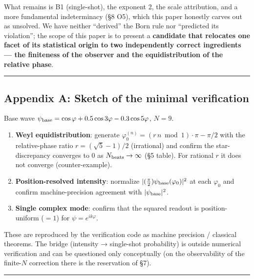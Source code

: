 \documentclass[
]{ltjsarticle}
\providecommand{\tightlist}{%
  \setlength{\itemsep}{0pt}\setlength{\parskip}{0pt}}
\begin{document}
What remains is B1 (single-shot), the exponent 2, the scale attribution,
and a more fundamental indeterminacy (§8 O5), which this paper honestly
carves out as unsolved. We have neither ``derived'' the Born rule nor
``predicted its violation''; the scope of this paper is to present a
\textbf{candidate that relocates one facet of its statistical origin to
two independently correct ingredients --- the finiteness of the observer
and the equidistribution of the relative phase}.

\begin{center}\rule{0.5\linewidth}{0.5pt}\end{center}

\subsection{Appendix A: Sketch of the minimal
verification}\label{appendix-a-sketch-of-the-minimal-verification}

Base wave
\(\psi_{\rm base}=\cos\varphi+0.5\cos3\varphi-0.3\cos5\varphi\),
\(N=9\).

\begin{enumerate}
\def\labelenumi{\arabic{enumi}.}
\tightlist
\item
  \textbf{Weyl equidistribution}: generate
  \(\varphi_0^{(n)}=(r\,n \bmod 1)\cdot\pi-\pi/2\) with the
  relative-phase ratio \(r=(\sqrt5-1)/2\) (irrational) and confirm the
  star-discrepancy converges to \(0\) as \(N_{\rm beats}\to\infty\) (§5
  table). For rational \(r\) it does not converge (counter-example).
\item
  \textbf{Position-resolved intensity}: normalize
  \(|(\tfrac{\pi}{2})\psi_{\rm base}(\varphi_0)|^2\) at each
  \(\varphi_0\) and confirm machine-precision agreement with
  \(|\psi_{\rm base}|^2\).
\item
  \textbf{Single complex mode}: confirm that the squared readout is
  position-uniform (\(=1\)) for \(\psi=e^{ik\varphi}\).
\end{enumerate}

These are reproduced by the verification code as machine precision /
classical theorems. The bridge (intensity → single-shot probability) is
outside numerical verification and can be questioned only conceptually
(on the observability of the finite-\(N\) correction there is the
reservation of §7).

\begin{center}\rule{0.5\linewidth}{0.5pt}\end{center}
\end{document}
